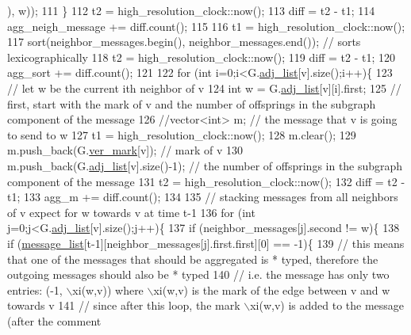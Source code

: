 \begin{DoxyCode}
      ), w));
111         \}
112         t2 = high\_resolution\_clock::now();
113         diff = t2 - t1;
114         agg\_neigh\_message += diff.count();
115 
116         t1 = high\_resolution\_clock::now();
117         sort(neighbor\_messages.begin(), neighbor\_messages.end()); \textcolor{comment}{// sorts lexicographically}
118         t2 = high\_resolution\_clock::now();
119         diff = t2 - t1;
120         agg\_sort += diff.count();
121 
122         \textcolor{keywordflow}{for} (\textcolor{keywordtype}{int} i=0;i<G.\hyperlink{classmarked__graph_a1a0bf7ca413a278763f7c878b3b6fd6f}{adj\_list}[v].size();i++)\{
123           \textcolor{comment}{// let w be the current ith neighbor of v}
124           \textcolor{keywordtype}{int} w = G.\hyperlink{classmarked__graph_a1a0bf7ca413a278763f7c878b3b6fd6f}{adj\_list}[v][i].first;
125           \textcolor{comment}{// first, start with the mark of v and the number of offsprings in the subgraph component of the
       message}
126           \textcolor{comment}{//vector<int> m; // the message that v is going to send to w}
127           t1 = high\_resolution\_clock::now();
128           m.clear();
129           m.push\_back(G.\hyperlink{classmarked__graph_ac83e9377dd4d8bb95be1ac949b127296}{ver\_mark}[v]); \textcolor{comment}{// mark of v}
130           m.push\_back(G.\hyperlink{classmarked__graph_a1a0bf7ca413a278763f7c878b3b6fd6f}{adj\_list}[v].size()-1); \textcolor{comment}{// the number of offsprings in the subgraph
       component of the message}
131           t2 = high\_resolution\_clock::now();
132           diff = t2 - t1;
133           agg\_m += diff.count();
134 
135           \textcolor{comment}{// stacking messages from all neighbors of v expect for w towards v at time t-1}
136           \textcolor{keywordflow}{for} (\textcolor{keywordtype}{int} j=0;j<G.\hyperlink{classmarked__graph_a1a0bf7ca413a278763f7c878b3b6fd6f}{adj\_list}[v].size();j++)\{
137             \textcolor{keywordflow}{if} (neighbor\_messages[j].second != w)\{
138               \textcolor{keywordflow}{if} (\hyperlink{classgraph__message_aa17fdb629b423343edfafa97252763ef}{message\_list}[t-1][neighbor\_messages[j].first.first][0] == -1)\{
139                 \textcolor{comment}{// this means that one of the messages that should be aggregated is * typed, therefore the
       outgoing messages should also be * typed}
140                 \textcolor{comment}{// i.e. the message has only two entries: (-1, \(\backslash\)xi(w,v)) where \(\backslash\)xi(w,v) is the mark of the
       edge between v and w towards v}
141                 \textcolor{comment}{// since after this loop, the mark \(\backslash\)xi(w,v) is added to the message (after the comment
}
\end{DoxyCode}
